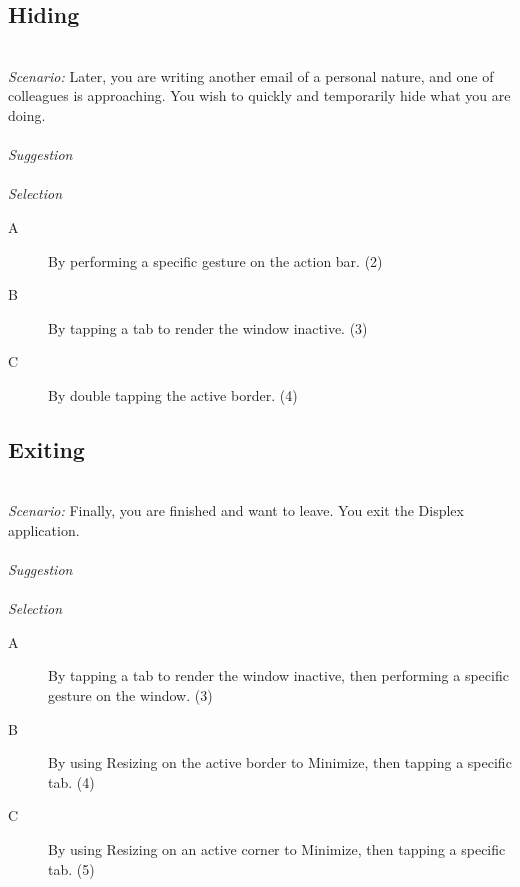 \documentclass[11pt]{amsart}
\begin{document}
\subsection{Hiding}
\hfill\\
\emph{Scenario:}
Later, you are writing another email of a personal nature, and one of colleagues is approaching. You wish to quickly and temporarily hide what you are doing.
\\\\
\emph{Suggestion}
\\\\
\emph{Selection}
\begin{description}
\item[A]{By performing a specific gesture on the action bar. (2)}
\item[B]{By tapping a tab to render the window inactive. (3)}
\item[C]{By double tapping the active border. (4)}
\end{description}


\subsection{Exiting}
\hfill\\
\emph{Scenario:}
Finally, you are finished and want to leave. You exit the Displex application.
\\\\
\emph{Suggestion}
\\\\
\emph{Selection}
\begin{description}
\item[A]{By tapping a tab to render the window inactive, then performing a specific gesture on the window. (3)}
\item[B]{By using Resizing on the active border to Minimize, then tapping a specific tab. (4)}
\item[C]{By using Resizing on an active corner to Minimize, then tapping a specific tab. (5)}
\end{description}
\end{document}
